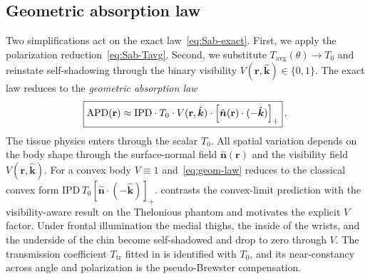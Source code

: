 \documentclass[journal,twocolumn,10pt]{IEEEtran}
\theoremstyle{plain}
\theoremstyle{remark}
\newcommand{\khat}{\hat{\bm{k}}}
\newcommand{\nhat}{\hat{\bm{n}}}
\newcommand{\rr}{\mathbf{r}}
\newcommand{\IPD}{\mathrm{IPD}}
\newcommand{\APD}{\mathrm{APD}}
\newcommand{\Tavg}{T_{\mathrm{avg}}}
\newcommand{\pospart}[1]{\left[#1\right]_{+}}
\newcommand{\Vis}{V}
\begin{document}
\subsection{Geometric absorption law}\label{subsec:pB-geom}
Two simplifications act on the exact law~\eqref{eq:Sab-exact}.
First, we apply the polarization reduction~\eqref{eq:Sab-Tavg}.
Second, we substitute $\Tavg(\theta) \to T_0$ and reinstate
self-shadowing through the binary visibility
$\Vis(\rr,\khat) \in \{0,1\}$. The exact law reduces to the
\textit{geometric absorption law}
\begin{equation}\label{eq:geom-law}
  \boxed{%
    \APD(\rr) \approx \IPD \cdot T_0 \cdot \Vis(\rr,\khat) \cdot
    \pospart{\nhat(\rr) \cdot (-\khat)}
  }\, .
\end{equation}
The tissue physics enters through the scalar $T_0$. All spatial
variation depends on the body shape through the surface-normal field
$\nhat(\rr)$ and the visibility field $\Vis(\rr,\khat)$. For a convex
body $\Vis \equiv 1$ and~\eqref{eq:geom-law} reduces to the classical
convex form $\IPD\,T_0 \pospart{\nhat\cdot(-\khat)}$.
 contrasts the convex-limit prediction with the
visibility-aware result on the Thelonious phantom and motivates the
explicit $\Vis$ factor. Under frontal illumination the medial
thighs, the inside of the wrists, and the underside of the chin
become self-shadowed and drop to zero through $\Vis$. The transmission coefficient
$T_{\mathrm{tr}}$ fitted in
\cite{Kodera2024,Diao2024,Funahashi2018} is identified with $T_0$,
and its near-constancy across angle and polarization is the
pseudo-Brewster compensation.
\end{document}
